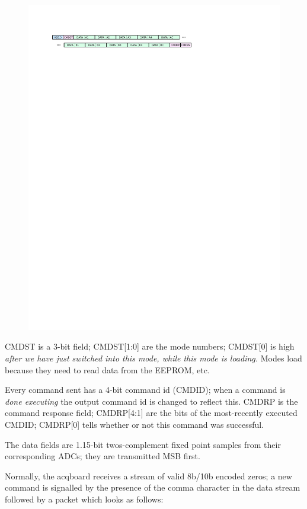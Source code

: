 \begin{figure}[h!]
\includegraphics[width=6in]{txpacket.svg}
\end{figure}

CMDST is a 3-bit field; CMDST[1:0] are the mode numbers; CMDST[0] is high \textit{after we have just switched into this mode, while this mode is loading.} Modes load because they need to read data from the EEPROM, etc. 

Every command sent has a 4-bit command id (CMDID); when a command is \textit{done executing} the output command id is changed to reflect this. CMDRP is the command response field; CMDRP[4:1] are the bits of the most-recently executed CMDID; CMDRP[0] tells whether or not this command was successful. 

The data fields are 1.15-bit twos-complement fixed point samples from their corresponding ADCs; they are transmitted MSB first. 

Normally, the acqboard receives a stream of valid 8b/10b encoded zeros; a new command is signalled by the presence of the comma character in the data stream followed by a packet which looks as follows:

